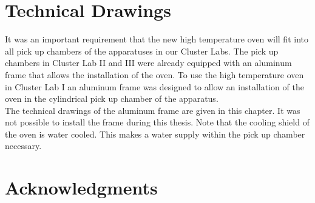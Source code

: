 \documentclass[parskip,12pt,headsepline,a4paper] {scrbook}
\begin{document}
\chapter{Technical Drawings}
\label{chap:techdraw}
It was an important requirement that the new high temperature oven will fit into all pick up chambers of the apparatuses in our Cluster Labs. The pick up chambers in Cluster Lab II and III were already equipped with an aluminum frame that allows the installation of the oven. To use the high temperature oven in Cluster Lab I an aluminum frame was designed to allow an installation of the oven in the cylindrical pick up chamber of the apparatus. \\
The technical drawings of the aluminum frame are given in this chapter. It was not possible to install the frame during this thesis. Note that the cooling shield of the oven is water cooled. This makes a water supply within the pick up chamber necessary.


















\newpage
{} \label{listoffig}
\listoffigures

\newpage
{} \label{listoftab}
\listoftables

\newpage
{} \label{bibliography}





\newpage
{} \label{acknow}
\chapter*{Acknowledgments}
\end{document}
